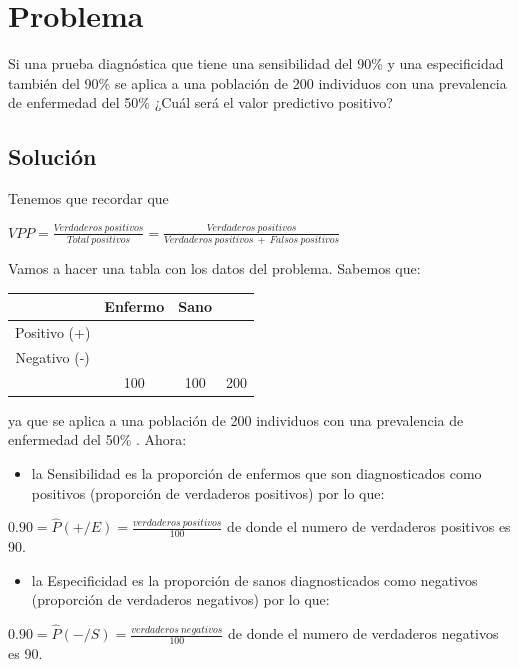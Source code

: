 \documentclass[
]{book}
\providecommand{\tightlist}{%
  \setlength{\itemsep}{0pt}\setlength{\parskip}{0pt}}
\begin{document}
\hypertarget{problema-11}{%
\section{Problema}\label{problema-11}}

Si una prueba diagnóstica que tiene una sensibilidad del 90\% y una especificidad también del 90\% se aplica a una población de 200 individuos con una prevalencia de enfermedad del 50\% ¿Cuál será el valor predictivo positivo?

\hypertarget{soluciuxf3n-9}{%
\subsection{Solución}\label{soluciuxf3n-9}}

Tenemos que recordar que

\(VPP=\frac{Verdaderos ~ positivos}{Total ~ positivos}=\frac{Verdaderos ~ positivos}{Verdaderos ~ positivos ~ + ~ Falsos ~ positivos}\)

Vamos a hacer una tabla con los datos del problema. Sabemos que:

\begin{longtable}[]{@{}cccc@{}}
\toprule
& Enfermo & Sano &\tabularnewline
\midrule
\endhead
Positivo (+) & & &\tabularnewline
Negativo (-) & & &\tabularnewline
& 100 & 100 & 200\tabularnewline
\bottomrule
\end{longtable}

ya que se aplica a una población de 200 individuos con una prevalencia de enfermedad del 50\% . Ahora:

\begin{itemize}
\tightlist
\item
  la Sensibilidad es la proporción de enfermos que son diagnosticados como positivos (proporción de verdaderos positivos) por lo que:
\end{itemize}

\(0.90 = \hat{P}(+/E) = \frac{verdaderos ~ positivos}{100}\) de donde el numero de verdaderos positivos es 90.

\begin{itemize}
\tightlist
\item
  la Especificidad es la proporción de sanos diagnosticados como negativos (proporción de verdaderos negativos) por lo que:
\end{itemize}

\(0.90 = \hat{P}(-/S) = \frac{verdaderos ~ negativos}{100}\) de donde el numero de verdaderos negativos es 90.
\end{document}

